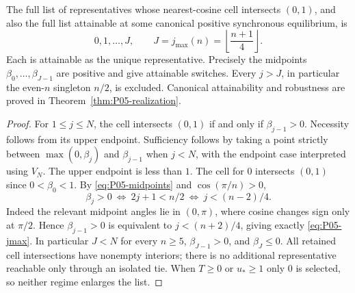 \begin{theorem}
\label{thm:P05-reachable}
The full list of representatives whose nearest-cosine cell intersects
$(0,1)$, and also the full list attainable at some canonical positive
synchronous equilibrium, is
\begin{equation}
 \boxed{0,1,\ldots,J,\qquad J=j_{\max}(n)=\left\lfloor\frac{n+1}{4}\right\rfloor.}
 \label{eq:P05-jmax}
\end{equation}
Each is attainable as the unique representative. Precisely the midpoints
$\beta_0,\ldots,\beta_{J-1}$ are positive and give attainable switches.
Every $j>J$, in particular the even-$n$ singleton $n/2$, is excluded.
Canonical attainability and robustness are proved in Theorem~\ref{thm:P05-realization}.
\end{theorem}
\begin{proof}
For $1\le j\le N$, the cell intersects $(0,1)$ if and only if
$\beta_{j-1}>0$. Necessity follows from its upper endpoint. Sufficiency
follows by taking a point strictly between
$\max(0,\beta_j)$ and $\beta_{j-1}$ when $j<N$, with the endpoint
case interpreted using $V_N$. The upper endpoint is less than $1$.
The cell for $0$ intersects $(0,1)$ since $0<\beta_0<1$.
By \eqref{eq:P05-midpoints} and $\cos(\pi/n)>0$,
\[
 \beta_j>0\ \Longleftrightarrow\ 2j+1<n/2
 \ \Longleftrightarrow\ j<(n-2)/4.
\]
Indeed the relevant midpoint angles lie in $(0,\pi)$, where cosine
changes sign only at $\pi/2$. Hence
$\beta_{j-1}>0$ is equivalent to $j<(n+2)/4$, giving exactly
\eqref{eq:P05-jmax}. In particular $J<N$ for every $n\ge5$,
$\beta_{J-1}>0$, and $\beta_J\le0$. All retained cell intersections
have nonempty interiors; there is no additional representative reachable
only through an isolated tie. When $T\ge0$ or $u_*\ge1$ only $0$
is selected, so neither regime enlarges the list.
\end{proof}

